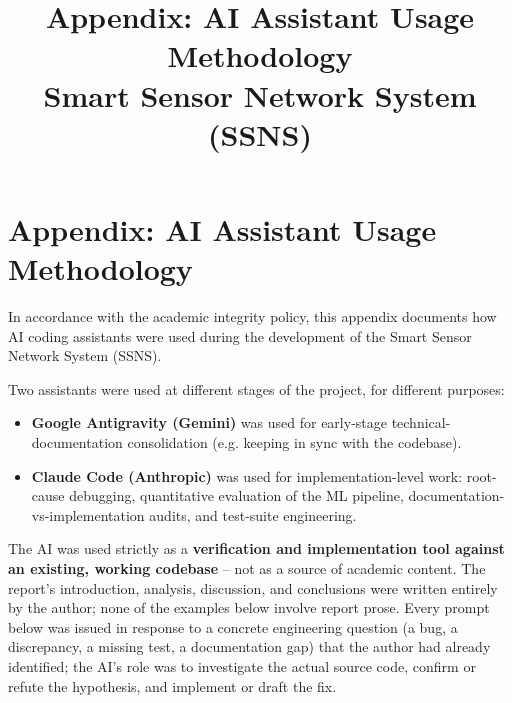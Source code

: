 \documentclass[conference]{IEEEtran}
\begin{document}
\title{Appendix: AI Assistant Usage Methodology\\
\large Smart Sensor Network System (SSNS)}

\author{
}

\maketitle

\section*{Appendix: AI Assistant Usage Methodology}

In accordance with the academic integrity policy, this appendix documents how AI coding assistants were used during the development of the Smart Sensor Network System (SSNS).

Two assistants were used at different stages of the project, for different purposes:

\begin{itemize}
\setlength{\itemsep}{2pt}
\item \textbf{Google Antigravity (Gemini)} was used for early-stage technical-documentation consolidation (e.g. keeping \texttt{} in sync with the codebase).
\item \textbf{Claude Code (Anthropic)} was used for implementation-level work: root-cause debugging, quantitative evaluation of the ML pipeline, documentation-vs-implementation audits, and test-suite engineering.
\end{itemize}

The AI was used strictly as a \textbf{verification and implementation tool against an existing, working codebase} -- not as a source of academic content. The report's introduction, analysis, discussion, and conclusions were written entirely by the author; none of the examples below involve report prose. Every prompt below was issued in response to a concrete engineering question (a bug, a discrepancy, a missing test, a documentation gap) that the author had already identified; the AI's role was to investigate the actual source code, confirm or refute the hypothesis, and implement or draft the fix.
\end{document}
